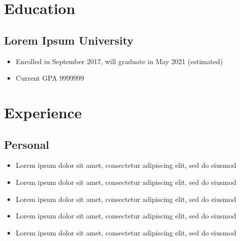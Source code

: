 \documentclass[]{props}
\begin{document}

\section{Education}
\subsection{Lorem Ipsum University}
\begin{itemize}
    \item[] Enrolled in September 2017, will graduate in May 2021 (estimated)
    \item[] Current GPA 9999999
\end{itemize}

\section{Experience}
\subsection{Personal}

\begin{itemize}
    \item[] Lorem ipsum dolor sit amet, consectetur adipiscing elit, sed do eiusmod
    \item[] Lorem ipsum dolor sit amet, consectetur adipiscing elit, sed do eiusmod
    \item[] Lorem ipsum dolor sit amet, consectetur adipiscing elit, sed do eiusmod
    \item[] Lorem ipsum dolor sit amet, consectetur adipiscing elit, sed do eiusmod
    \item[] Lorem ipsum dolor sit amet, consectetur adipiscing elit, sed do eiusmod
\end{itemize}
\end{document}
